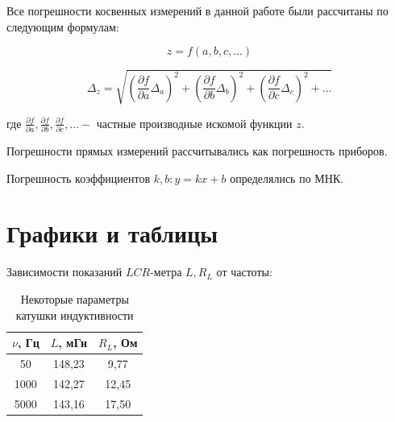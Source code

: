 \documentclass[a4paper, 12pt]{article}%
\begin{document}
Все погрешности косвенных измерений в данной работе были рассчитаны по следующим формулам:

$$ z=f(a, b, c, \ldots) $$

$$ \Delta_{z}=\sqrt{\left(\frac{\partial f}{\partial a} \Delta_{a}\right)^{2}+\left(\frac{\partial f}{\partial b} \Delta_{b}\right)^{2}+\left(\frac{\partial f}{\partial c} \Delta_{c}\right)^{2}+\ldots} $$

где $\frac{\partial f}{\partial a}, \frac{\partial f}{\partial b}, \frac{\partial f}{\partial c}, \ldots-$ частные производные искомой функции $z$.

Погрешности прямых измерений рассчитывались как погрешность приборов.

Погрешность коэффициентов $k,b: y = kx + b$ определялись по МНК.

\section{Графики и таблицы}

Зависимости показаний $LCR$-метра $L, R_L$ от частоты:   

\begin{table}[h!]
\begin{center}
\begin{tabular}{|c|c|c|}
\hline
$\nu$, Гц & $L$, мГн & $R_L$, Ом \\ \hline
50        & 148,23    & 9,77      \\ \hline
1000      & 142,27    & 12,45      \\ \hline
5000      & 143,16    & 17,50      \\ \hline
\end{tabular}
\caption{Некоторые параметры катушки индуктивности}
\end{center}
\end{table}
\end{document}

